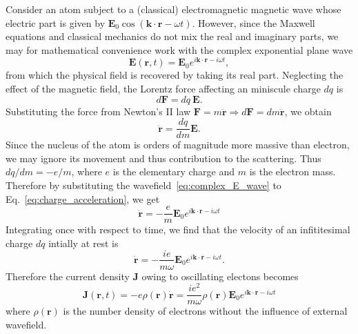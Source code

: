 Consider an atom subject to a (classical) electromagnetic magnetic wave whose electric part is given by $\mathbf{E}_0 \cos (\mathbf{k}\cdot\mathbf{r}- \omega t)$. However, since the Maxwell equations and classical mechanics do not mix the real and imaginary parts, we may for mathematical convenience work with the complex exponential plane wave 
\begin{equation}\label{eq:complex_E_wave}
\mathbf{E}(\mathbf{r},t) = \mathbf{E}_0 e^{i \mathbf{k}\cdot\mathbf{r}-i \omega t},
\end{equation}
from which the physical field is recovered by taking its real part. Neglecting the effect of the magnetic field, the Lorentz force affecting an miniscule charge $dq$ is
\begin{equation}
d\mathbf{F} = dq \ \mathbf{E}.
\end{equation}
Substituting the force from Newton's II law $\mathbf{F} = m \ddot{\mathbf{r}} \Rightarrow d\mathbf{F} = dm \ddot{\mathbf{r}}$, we obtain
\begin{equation}\label{eq:charge_acceleration}
\ddot{\mathbf{r}} = \frac{dq}{dm} \mathbf{E}.
\end{equation}
Since the nucleus of the atom is orders of magnitude more massive than electron, we may ignore its movement and thus contribution to the scattering. Thus $dq/dm = -e/m$, where $e$ is the elementary charge and $m$ is the electron mass. Therefore by substituting the wavefield~\eqref{eq:complex_E_wave} to Eq.~\eqref{eq:charge_acceleration}, we get
\begin{equation}
\ddot{\mathbf{r}} = -\frac{e}{m} \mathbf{E}_0 e^{i \mathbf{k}\cdot\mathbf{r}-i \omega t}
\end{equation}
Integrating once with respect to time, we find that the velocity of an infititesimal charge $dq$ intially at rest is
\begin{equation}
\dot{\mathbf{r}} = -\frac{ie}{m\omega} \mathbf{E}_0 e^{i \mathbf{k}\cdot\mathbf{r}-i \omega t}.
\end{equation}
Therefore the current density $\mathbf{J}$ owing to oscillating electons becomes
\begin{equation}
\mathbf{J}(\mathbf{r},t) = -e\rho(\mathbf{r})\dot{\mathbf{r}} =
\frac{ie^2}{m\omega} \rho(\mathbf{r}) \mathbf{E}_0 e^{i \mathbf{k}\cdot\mathbf{r}-i \omega t}
\end{equation}
where $\rho(\mathbf{r})$ is the number density of electrons without the influence of external wavefield.
%
%
 